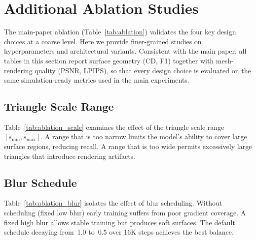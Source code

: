 \documentclass{llmxive}
\begin{document}
\section{Additional Ablation Studies}
\label{sec:app_ablation}

The main-paper ablation (Table~\ref{tab:ablation}) validates the four key design choices at a coarse level. Here we provide finer-grained studies on hyperparameters and architectural variants. Consistent with the main paper, all tables in this section report surface geometry (CD, F1) together with mesh-rendering quality (PSNR, LPIPS), so that every design choice is evaluated on the same simulation-ready metrics used in the main experiments.




\subsection{Triangle Scale Range}
\label{sec:app_ablation_scale}

Table~\ref{tab:ablation_scale} examines the effect of the triangle scale range $[s_{\min}, s_{\max}]$. A range that is too narrow limits the model's ability to cover large surface regions, reducing recall. A range that is too wide permits excessively large triangles that introduce rendering artifacts.

\begin{table}[!htbp]
\centering
{}
\caption{\textbf{Ablation on triangle scale range} (RE10K, 6 views).}
\label{tab:ablation_scale}
\end{table}

\subsection{Blur Schedule}
\label{sec:app_ablation_blur}

Table~\ref{tab:ablation_blur} isolates the effect of blur scheduling. Without scheduling (fixed low blur) early training suffers from poor gradient coverage. A fixed high blur allows stable training but produces soft surfaces. The default schedule decaying from~1.0 to~0.5 over 16K steps achieves the best balance.
\end{document}
